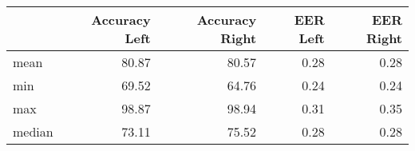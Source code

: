 \begin{tabular}{lrrrr}
\toprule
{} &  Accuracy Left &  Accuracy Right &  EER Left &  EER Right \\
\midrule
mean   &          80.87 &           80.57 &      0.28 &       0.28 \\
min    &          69.52 &           64.76 &      0.24 &       0.24 \\
max    &          98.87 &           98.94 &      0.31 &       0.35 \\
median &          73.11 &           75.52 &      0.28 &       0.28 \\
\bottomrule
\end{tabular}
